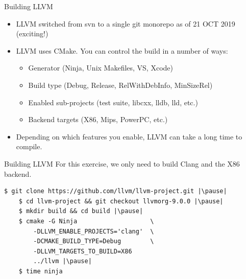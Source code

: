 \documentclass{beamer}
\begin{document}

\begin{frame}{Building LLVM}
    \begin{itemize}
        \item LLVM switched from svn to a single git monorepo as of 21 OCT 2019 (exciting!)
        \item LLVM uses CMake. You can control the build in a number of ways:
        \begin{itemize}
            \item Generator (Ninja, Unix Makefiles, VS, Xcode)
            \item Build type (Debug, Release, RelWithDebInfo, MinSizeRel)
            \item Enabled sub-projects (test suite, libcxx, lldb, lld, etc.)
            \item Backend targets (X86, Mips, PowerPC, etc.)
        \end{itemize}
        \item Depending on which features you enable, LLVM can take a long time to compile.
    \end{itemize}
\end{frame}


\begin{frame}[fragile]{Building LLVM}
    For this exercise, we only need to build Clang and the X86 backend.

    \begin{lstlisting}[gobble=4]
    $ git clone https://github.com/llvm/llvm-project.git |\pause|
    $ cd llvm-project && git checkout llvmorg-9.0.0 |\pause|
    $ mkdir build && cd build |\pause|
    $ cmake -G Ninja                    \
        -DLLVM_ENABLE_PROJECTS='clang'  \
        -DCMAKE_BUILD_TYPE=Debug        \
        -DLLVM_TARGETS_TO_BUILD=X86
        ../llvm |\pause|
    $ time ninja

    \end{lstlisting}
\end{frame}

\end{document}
